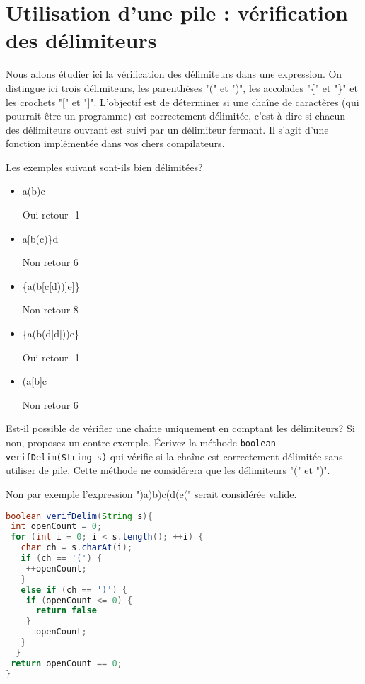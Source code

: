 \documentclass[iutinfo,a4paper,nocorrections,10pt]{ustl-tdtp}
\begin{document}
\section{Utilisation d'une pile : vérification des délimiteurs}
Nous allons étudier ici la vérification des délimiteurs dans une expression. On distingue ici trois délimiteurs, les parenthèses "(" et ")", les accolades "\{" et "\}" et les crochets "[" et "]". L'objectif est de déterminer si une chaîne de caractères (qui pourrait être un programme) est correctement délimitée, c'est-à-dire si chacun des délimiteurs ouvrant est suivi par un délimiteur fermant. Il s'agit d'une fonction implémentée dans vos chers compilateurs.

\question Les exemples suivant sont-ils bien délimitées?
\begin{itemize}
\item[] a(b)c 
\begin{correction}{\color{red}Oui retour -1}\end{correction}
\item[] a[b(c)\}d 
\begin{correction}{\color{red}Non retour 6}\end{correction}
\item[] \{a(b[c[d))]e]\} 
\begin{correction}{\color{red}Non retour 8}\end{correction}
\item[] \{a(b(d[d]))e\}
\begin{correction}{\color{red}Oui retour -1}\end{correction}
\item[] (a[b]c
\begin{correction}{\color{red}Non retour 6}\end{correction}
\end{itemize}

\question Est-il possible de vérifier une chaîne uniquement en comptant les délimiteurs? Si non, proposez un contre-exemple. Écrivez la méthode \texttt{boolean verifDelim(String s)} qui vérifie si la chaîne est correctement délimitée sans utiliser de pile. Cette méthode ne considérera que les délimiteurs "(" et ")".

\begin{correction}
{\color{red}
Non par exemple l'expression ")a)b)c(d(e(" serait considérée valide.

\begin{lstlisting}[language=Java]
boolean verifDelim(String s){
 int openCount = 0; 
 for (int i = 0; i < s.length(); ++i) {
   char ch = s.charAt(i);
   if (ch == '(') {
    ++openCount;
   }
   else if (ch == ')') {
    if (openCount <= 0) {
      return false
    }
    --openCount;
   }
  }
 return openCount == 0;
}
\end{lstlisting}

}

\end{correction}
\end{document}
